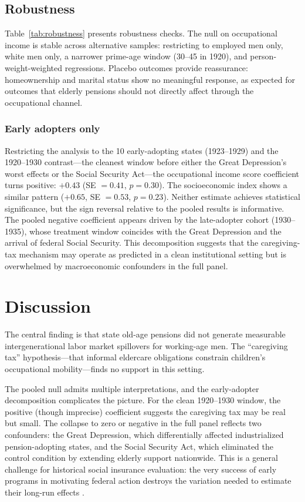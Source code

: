 \documentclass[12pt]{article}
\begin{document}
\subsection{Robustness}



Table~\ref{tab:robustness} presents robustness checks. The null on occupational income is stable across alternative samples: restricting to employed men only, white men only, a narrower prime-age window (30--45 in 1920), and person-weight-weighted regressions. Placebo outcomes provide reassurance: homeownership and marital status show no meaningful response, as expected for outcomes that elderly pensions should not directly affect through the occupational channel.

\subsubsection*{Early adopters only} Restricting the analysis to the 10 early-adopting states (1923--1929) and the 1920--1930 contrast---the cleanest window before either the Great Depression's worst effects or the Social Security Act---the occupational income score coefficient turns positive: $+0.43$ (SE $= 0.41$, $p = 0.30$). The socioeconomic index shows a similar pattern ($+0.65$, SE $= 0.53$, $p = 0.23$). Neither estimate achieves statistical significance, but the sign reversal relative to the pooled results is informative. The pooled negative coefficient appears driven by the late-adopter cohort (1930--1935), whose treatment window coincides with the Great Depression and the arrival of federal Social Security. This decomposition suggests that the caregiving-tax mechanism may operate as predicted in a clean institutional setting but is overwhelmed by macroeconomic confounders in the full panel.

\section{Discussion}

The central finding is that state old-age pensions did not generate measurable intergenerational labor market spillovers for working-age men. The ``caregiving tax'' hypothesis---that informal eldercare obligations constrain children's occupational mobility---finds no support in this setting.

The pooled null admits multiple interpretations, and the early-adopter decomposition complicates the picture. For the clean 1920--1930 window, the positive (though imprecise) coefficient suggests the caregiving tax may be real but small. The collapse to zero or negative in the full panel reflects two confounders: the Great Depression, which differentially affected industrialized pension-adopting states, and the Social Security Act, which eliminated the control condition by extending elderly support nationwide. This is a general challenge for historical social insurance evaluation: the very success of early programs in motivating federal action destroys the variation needed to estimate their long-run effects \citep{skocpol1988}.
\end{document}
